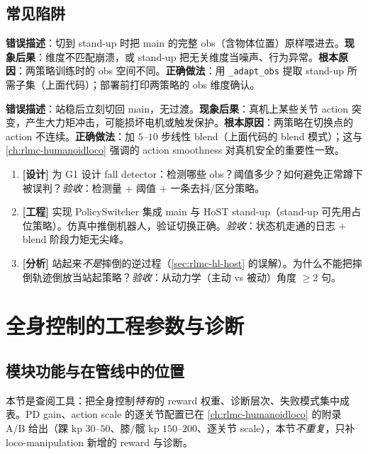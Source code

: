 \subsection{常见陷阱}
\begin{pitfall}
\textbf{错误描述}：切到 stand-up 时把 main 的完整 obs（含物体位置）原样喂进去。\textbf{现象后果}：维度不匹配崩溃，或 stand-up 把无关维度当噪声、行为异常。\textbf{根本原因}：两策略训练时的 obs 空间不同。\textbf{正确做法}：用 \verb|_adapt_obs| 提取 stand-up 所需子集（上面代码）；部署前打印两策略的 obs 维度确认。
\end{pitfall}
\begin{pitfall}
\textbf{错误描述}：站稳后立刻切回 main，无过渡。\textbf{现象后果}：真机上某些关节 action 突变，产生大力矩冲击，可能损坏电机或触发保护。\textbf{根本原因}：两策略在切换点的 action 不连续。\textbf{正确做法}：加 $5$--$10$ 步线性 blend（上面代码的 blend 模式）；这与 \cref{ch:rlmc-humanoidloco} 强调的 action smoothness 对真机安全的重要性一致。
\end{pitfall}

\begin{practice}[本节动手]
\begin{enumerate}
  \item \textbf{[设计]} 为 G1 设计 fall detector：检测哪些 obs？阈值多少？如何避免正常蹲下被误判？\emph{验收}：检测量 $+$ 阈值 $+$ 一条去抖/区分策略。
  \item \textbf{[工程]} 实现 PolicySwitcher 集成 main 与 HoST stand-up（stand-up 可先用占位策略）。仿真中推倒机器人，验证切换正确。\emph{验收}：状态机走通的日志 $+$ blend 阶段力矩无尖峰。
  \item \textbf{[分析]} 站起来\emph{不是}摔倒的逆过程（\cref{sec:rlmc-hl-host} 的误解）。为什么不能把摔倒轨迹倒放当站起策略？\emph{验收}：从动力学（主动 vs 被动）角度 $\geq 2$ 句。
\end{enumerate}
\end{practice}

\section{全身控制的工程参数与诊断}\label{sec:rlmc-wbc-params}

\subsection{模块功能与在管线中的位置}
本节是查阅工具：把全身控制\emph{特有}的 reward 权重、诊断层次、失败模式集中成表。PD gain、action scale 的逐关节配置已在 \cref{ch:rlmc-humanoidloco} 的附录 A/B 给出（踝 kp $30$--$50$、膝/髋 kp $150$--$200$、逐关节 scale），本节\emph{不重复}，只补 loco-manipulation 新增的 reward 与诊断。

